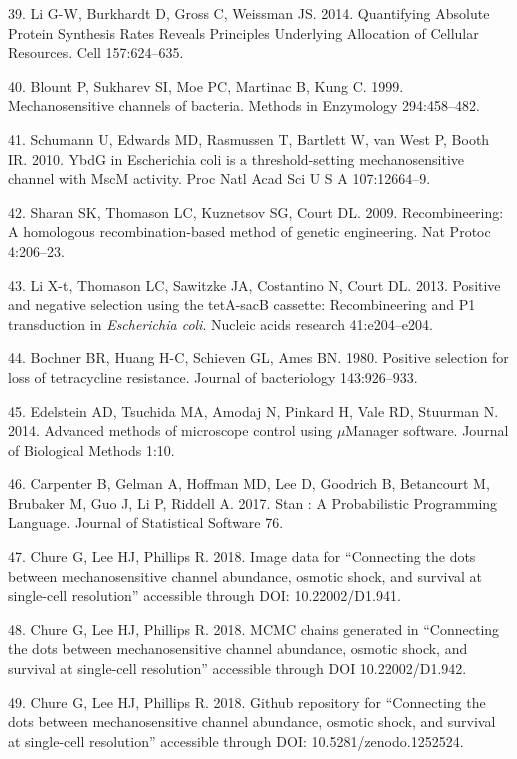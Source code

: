 \hypertarget{ref-li2014}{}
39. Li
G-W,
Burkhardt
D,
Gross
C,
Weissman
JS.
2014.
Quantifying
Absolute
Protein
Synthesis
Rates
Reveals
Principles
Underlying
Allocation
of
Cellular
Resources.
Cell
157:624--635.

\hypertarget{ref-blount1999}{}
40.
Blount
P,
Sukharev
SI,
Moe
PC,
Martinac
B,
Kung
C.
1999.
Mechanosensitive
channels
of
bacteria.
Methods
in
Enzymology
294:458--482.

\hypertarget{ref-schumann2010}{}
41.
Schumann
U,
Edwards
MD,
Rasmussen
T,
Bartlett
W, van
West
P,
Booth
IR.
2010.
YbdG
in
Escherichia
coli
is a
threshold-setting
mechanosensitive
channel
with
MscM
activity.
Proc
Natl
Acad
Sci U
S A
107:12664--9.

\hypertarget{ref-sharan2009}{}
42.
Sharan
SK,
Thomason
LC,
Kuznetsov
SG,
Court
DL.
2009.
Recombineering:
A
homologous
recombination-based
method
of
genetic
engineering.
Nat
Protoc
4:206--23.

\hypertarget{ref-li2013}{}
43. Li
X-t,
Thomason
LC,
Sawitzke
JA,
Costantino
N,
Court
DL.
2013.
Positive
and
negative
selection
using
the
tetA-sacB
cassette:
Recombineering
and P1
transduction
in
\emph{Escherichia
coli}.
Nucleic
acids
research
41:e204--e204.

\hypertarget{ref-bochner1980}{}
44.
Bochner
BR,
Huang
H-C,
Schieven
GL,
Ames
BN.
1980.
Positive
selection
for
loss
of
tetracycline
resistance.
Journal
of
bacteriology
143:926--933.

\hypertarget{ref-edelstein2014}{}
45.
Edelstein
AD,
Tsuchida
MA,
Amodaj
N,
Pinkard
H,
Vale
RD,
Stuurman
N.
2014.
Advanced
methods
of
microscope
control
using
\(\mu\)Manager
software.
Journal
of
Biological
Methods
1:10.

\hypertarget{ref-carpenter2017}{}
46.
Carpenter
B,
Gelman
A,
Hoffman
MD,
Lee D,
Goodrich
B,
Betancourt
M,
Brubaker
M, Guo
J, Li
P,
Riddell
A.
2017.
Stan :
A
Probabilistic
Programming
Language.
Journal
of
Statistical
Software
76.

\hypertarget{ref-chure2018a}{}
47.
Chure
G, Lee
HJ,
Phillips
R.
2018.
Image
data
for
``Connecting
the
dots
between
mechanosensitive
channel
abundance,
osmotic
shock,
and
survival
at
single-cell
resolution''
accessible
through
DOI:
10.22002/D1.941.

\hypertarget{ref-chure2018}{}
48.
Chure
G, Lee
HJ,
Phillips
R.
2018.
MCMC
chains
generated
in
``Connecting
the
dots
between
mechanosensitive
channel
abundance,
osmotic
shock,
and
survival
at
single-cell
resolution''
accessible
through
DOI
10.22002/D1.942.

\hypertarget{ref-chure2018b}{}
49.
Chure
G, Lee
HJ,
Phillips
R.
2018.
Github
repository
for
``Connecting
the
dots
between
mechanosensitive
channel
abundance,
osmotic
shock,
and
survival
at
single-cell
resolution''
accessible
through
DOI:
10.5281/zenodo.1252524.
